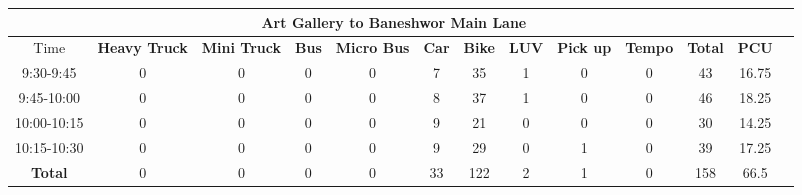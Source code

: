 \begin{landscape}
\begin{table}[h!]
\vspace{0.5cm}
\begin{tabular}{|c|c|c|c|c|c|c|c|c|c|c|c|c|}
    \hline
    \multicolumn{12}{|c|}{\textbf{Art Gallery to Baneshwor Main Lane}} \\
    \hline
        Time & \textbf{Heavy Truck} & \textbf{Mini Truck} & \textbf{Bus} & \textbf{Micro Bus} & \textbf{Car} & \textbf{Bike} & \textbf{LUV} & \textbf{Pick up} & \textbf{Tempo} & \textbf{\textbf{Total}} & \textbf{PCU} \\
    \hline
9:30-9:45	&0	&0	&0	&0	&7	&35	&1	&0	&0	&43	&16.75 \\ \hline
9:45-10:00	&0	&0	&0	&0	&8	&37	&1	&0	&0	&46	&18.25 \\ \hline
10:00-10:15	&0	&0	&0	&0	&9	&21	&0	&0	&0	&30	&14.25 \\ \hline
10:15-10:30	&0	&0	&0	&0	&9	&29	&0	&1	&0	&39	&17.25 \\ \hline
\textbf{Total}	&0	&0	&0	&0	&33	&122	&2	&1	&0 &158 &66.5 \\ \hline

\end{tabular}

\end{table}
\end{landscape}

